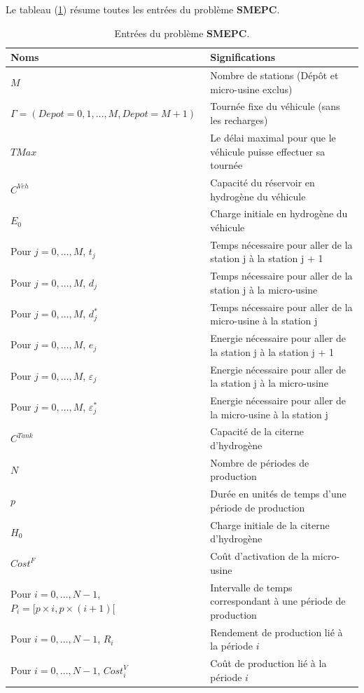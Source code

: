 Le tableau (\ref{inputs_SMEPC}) résume toutes les entrées du problème \textbf{SMEPC}.

\begin{table}[H]
	\centering
	\begin{tabular}{|*{2}{m{8cm}|}}
		\hline
		\rowcolor{cyan}	Noms & Significations\\
		\hline
		$M$  & Nombre de stations (Dépôt et micro-usine exclus)   \\
		\hline
		$\Gamma=(\textit{Depot}=0, 1, \dots, M, \textit{Depot}=M+1)$  & Tournée fixe du véhicule (sans les recharges)  \\
		\hline
		$TMax$  & Le délai maximal pour que le véhicule puisse effectuer sa tournée \\
		\hline
		$C^{Veh}$  & Capacité du réservoir en hydrogène du véhicule   \\
		\hline
		$E_0$  & Charge initiale en hydrogène du véhicule \\
		\hline
		Pour $j=0, \dots, M$, $ t_j$ & Temps nécessaire pour aller de la station j à la station j + 1 \\
		\hline
		Pour $j=0, \dots, M$, $ d_j$ & Temps nécessaire pour aller de la station j à la micro-usine  \\
		\hline
		Pour $j=0, \dots, M $, $d_j^*$  & Temps nécessaire pour aller de la micro-usine à la station j    \\
		\hline
		Pour $j=0, \dots, M $, $e_j$ & Energie nécessaire pour aller de la station j à la station j + 1 \\
		\hline
		Pour $j=0, \dots, M $, $\varepsilon_j$ & Energie nécessaire pour aller de la station j à la micro-usine \\
		\hline
		Pour $j=0, \dots, M $, $\varepsilon_j^*$ & Energie nécessaire pour aller de la micro-usine à la station j   \\
		\hline
		$C^{Tank}$ & Capacité de la citerne d'hydrogène\\
		\hline
		$N$  & Nombre de périodes de production    \\
		\hline
		$p$  & Durée en unités de temps d'une période de production \\
		\hline
		$H_0$  & Charge initiale de la citerne d'hydrogène \\
		\hline
		$Cost^F$  & Coût d'activation de la micro-usine \\
		\hline
		Pour $i=0, \dots, N-1$, $P_i=[p \times i, p \times (i+1)[$ & Intervalle de temps correspondant à une période de production \\
		\hline
		Pour $i=0, \dots, N-1$, $R_i$ &Rendement de production lié à la période $i$ \\
		\hline
		Pour $i=0, \dots, N-1$, $Cost_i^V$ &  Coût de production lié à la période $i$ \\
		\hline
	\end{tabular}
	\caption[Entrées du problème SMEPC]{Entrées du problème \textbf{SMEPC}. \label{inputs_SMEPC}}
\end{table}


